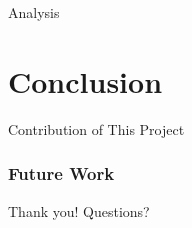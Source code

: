 \documentclass{beamer}
\begin{document}
\begin{frame}{Analysis}

\end{frame}

\section{Conclusion}

\begin{frame}{Contribution of This Project}

\end{frame}

\begin{frame} \frametitle{Future Work}

\end{frame}

\begin{frame}
Thank you! Questions?
\end{frame}
\end{document}
